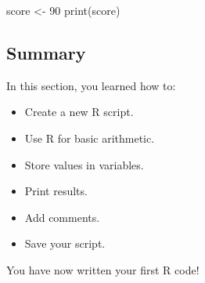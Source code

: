 \documentclass[
  letterpaper,
  DIV=11,
  numbers=noendperiod]{scrartcl}
\newenvironment{Shaded}{\begin{snugshade}}{\end{snugshade}}
\newcommand{\DecValTok}[1]{\textcolor[rgb]{0.68,0.00,0.00}{#1}}
\newcommand{\FunctionTok}[1]{\textcolor[rgb]{0.28,0.35,0.67}{#1}}
\newcommand{\NormalTok}[1]{\textcolor[rgb]{0.00,0.23,0.31}{#1}}
\newcommand{\OtherTok}[1]{\textcolor[rgb]{0.00,0.23,0.31}{#1}}
\providecommand{\tightlist}{%
  \setlength{\itemsep}{0pt}\setlength{\parskip}{0pt}}
\begin{document}
\begin{Shaded}
\begin{Highlighting}[]
\NormalTok{score }\OtherTok{\textless{}{-}} \DecValTok{90}
\FunctionTok{print}\NormalTok{(score)}
\end{Highlighting}
\end{Shaded}

\subsection{Summary}\label{summary}

In this section, you learned how to:

\begin{itemize}
\tightlist
\item
  Create a new R script.
\item
  Use R for basic arithmetic.
\item
  Store values in variables.
\item
  Print results.
\item
  Add comments.
\item
  Save your script.
\end{itemize}

You have now written your first R code!
\end{document}
